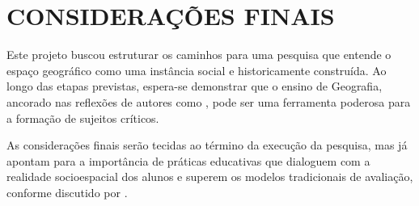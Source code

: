 \chapter{CONSIDERAÇÕES FINAIS}

Este projeto buscou estruturar os caminhos para uma pesquisa que entende o espaço geográfico como uma instância social e historicamente construída. Ao longo das etapas previstas, espera-se demonstrar que o ensino de Geografia, ancorado nas reflexões de autores como \cite{milton-ne}, pode ser uma ferramenta poderosa para a formação de sujeitos críticos.

As considerações finais serão tecidas ao término da execução da pesquisa, mas já apontam para a importância de práticas educativas que dialoguem com a realidade socioespacial dos alunos e superem os modelos tradicionais de avaliação, conforme discutido por \cite{luckesi-avaprend}.